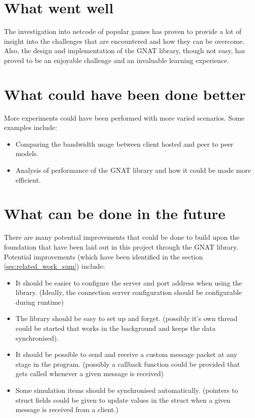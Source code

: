 \section{What went well}
The investigation into netcode of popular games has proven to provide a lot of insight into the challenges that are encountered and how they can be overcome. Also, the design and implementation of the GNAT library, though not easy, has proved to be an enjoyable challenge and an invaluable learning experience.


\section{What could have been done better}
More experiments could have been performed with more varied scenarios. Some examples include:
\begin{itemize}
\item Comparing the bandwidth usage between client hosted and peer to peer models.
\item Analysis of performance of the GNAT library and how it could be made more efficient.
\end{itemize}


\section{What can be done in the future}
There are many potential improvements that could be done to build upon the foundation that have been laid out in this project through the GNAT library. Potential improvements (which have been identified in the section \ref{sec:related_work_sum}) include:
\begin{itemize}
\item It should be easier to configure the server and port address when using the library. (Ideally, the connection server configuration should be configurable during runtime)
\item The library should be easy to set up and forget. (possibly it's own thread could be started that works in the background and keeps the data synchronised).
\item It should be possible to send and receive a custom message packet at any stage in the program. (possibly a callback function could be provided that gets called whenever a given message is received)
\item Some simulation items should be synchronised automatically. (pointers to struct fields could be given to update values in the struct when a given message is received from a client.)
\end{itemize}
